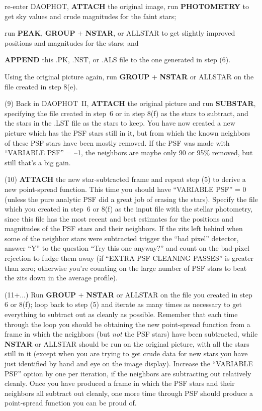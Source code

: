  re-enter DAOPHOT, {\bf ATTACH} the original image, run
{\bf PHOTOMETRY} to get sky values and crude magnitudes for the faint
stars;

 run {\bf PEAK}, {\bf GROUP} $+$ {\bf NSTAR}, or ALLSTAR
to get slightly improved positions and magnitudes for the stars; and

 {\bf APPEND} this .PK, .NST, or .ALS file to the one
generated in step (6).

 Using the original picture again, run {\bf GROUP} $+$
{\bf NSTAR} or ALLSTAR on the file created in step 8(e).

\item{(9)} Back in DAOPHOT~II, {\bf ATTACH} the original picture and
run {\bf SUBSTAR}, specifying the file created in step~6 or in step
8(f) as the stars to subtract, and the stars in the .LST file as the
stars to keep.  You have now created a new picture which has the PSF
stars still in it, but from which the known neighbors of these PSF
stars have been mostly removed.  If the PSF was made with
``VARIABLE PSF'' = --1, the neighbors are maybe only 90 or 95\%
removed, but still that's a big gain.

\item{(10)} {\bf ATTACH} the new star-subtracted frame and repeat step
(5) to derive a new point-spread function.  This time you should have
``VARIABLE PSF'' = 0 (unless the pure analytic PSF did a great job of
erasing the stars).  Specify the file which
you created in step~6 or 8(f) as the input file with the stellar photometry,
since this file has the most recent and best estimates for the
positions and magnitudes of the PSF stars and their neighbors. If the
zits left behind when some of the neighbor stars were subtracted
trigger the ``bad pixel'' detector, answer ``Y'' to the question
``Try this one anyway?'' and count on the bad-pixel rejection to fudge
them away (if ``EXTRA PSF CLEANING PASSES'' is greater than zero;
otherwise you're counting on the large number of PSF stars to beat the
zits down in the average profile).

\item{(11+...)} Run {\bf GROUP} $+$ {\bf NSTAR} or ALLSTAR on the
file you created in step 6 or 8(f); loop back to step (5) and iterate
as many times as necessary to get everything to subtract out as cleanly
as possible.  Remember that each time through the loop you should be
obtaining the new point-spread function from a frame in which the
neighbors (but {\it not\/} the PSF stars) have been subtracted, while
{\bf NSTAR} or ALLSTAR should be run on the original picture,
with all the stars still in it (except when you are trying to get crude
data for new stars you have just identified by hand and eye on the
image display).  Increase the ``VARIABLE PSF'' option by one per
iteration, if the neighbors are subtracting out relatively cleanly.
Once you have produced a frame in which the PSF stars and their
neighbors all subtract out cleanly, one more time through PSF should
produce a point-spread function you can be proud of.

